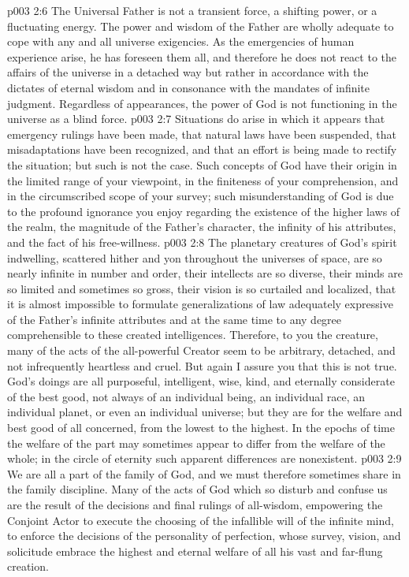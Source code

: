 \vs p003 2:6 \pc The Universal Father is not a transient force, a shifting power, or a fluctuating energy. The power and wisdom of the Father are wholly adequate to cope with any and all universe exigencies. As the emergencies of human experience arise, he has foreseen them all, and therefore he does not react to the affairs of the universe in a detached way but rather in accordance with the dictates of eternal wisdom and in consonance with the mandates of infinite judgment. Regardless of appearances, the power of God is not functioning in the universe as a blind force.
\vs p003 2:7 Situations do arise in which it appears that emergency rulings have been made, that natural laws have been suspended, that misadaptations have been recognized, and that an effort is being made to rectify the situation; but such is not the case. Such concepts of God have their origin in the limited range of your viewpoint, in the finiteness of your comprehension, and in the circumscribed scope of your survey; such misunderstanding of God is due to the profound ignorance you enjoy regarding the existence of the higher laws of the realm, the magnitude of the Father’s character, the infinity of his attributes, and the fact of his free\hyp{}willness.
\vs p003 2:8 The planetary creatures of God’s spirit indwelling, scattered hither and yon throughout the universes of space, are so nearly infinite in number and order, their intellects are so diverse, their minds are so limited and sometimes so gross, their vision is so curtailed and localized, that it is almost impossible to formulate generalizations of law adequately expressive of the Father’s infinite attributes and at the same time to any degree comprehensible to these created intelligences. Therefore, to you the creature, many of the acts of the all\hyp{}powerful Creator seem to be arbitrary, detached, and not infrequently heartless and cruel. But again I assure you that this is not true. God’s doings are all purposeful, intelligent, wise, kind, and eternally considerate of the best good, not always of an individual being, an individual race, an individual planet, or even an individual universe; but they are for the welfare and best good of all concerned, from the lowest to the highest. In the epochs of time the welfare of the part may sometimes appear to differ from the welfare of the whole; in the circle of eternity such apparent differences are nonexistent.
\vs p003 2:9 We are all a part of the family of God, and we must therefore sometimes share in the family discipline. Many of the acts of God which so disturb and confuse us are the result of the decisions and final rulings of all\hyp{}wisdom, empowering the Conjoint Actor to execute the choosing of the infallible will of the infinite mind, to enforce the decisions of the personality of perfection, whose survey, vision, and solicitude embrace the highest and eternal welfare of all his vast and far\hyp{}flung creation.
